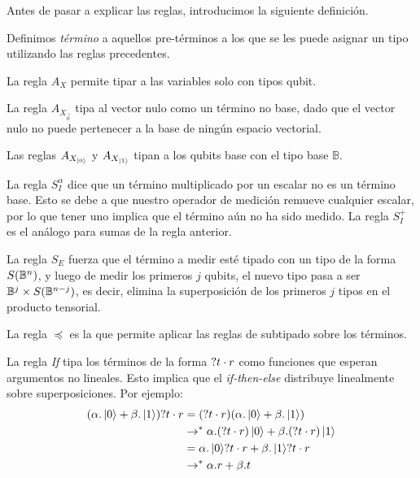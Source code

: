 Antes de pasar a explicar las reglas, introducimos la siguiente definición.

\begin{definition}
	Definimos \textit{término} a aquellos pre-términos a los que se les puede asignar un tipo utilizando las reglas precedentes.
\end{definition}

La regla \( A_X \) permite tipar a las variables solo con tipos qubit.

La regla \( A_{X_{\vec{0}}} \) tipa al vector nulo como un término no base, dado que el vector nulo no puede pertenecer a la base de ningún espacio vectorial.

Las reglas \( A_{X_{\ket{0}}} \) y \( A_{X_{\ket{1}}} \) tipan a los qubits base con el tipo base \( \mathbb{B} \).

La regla \( S_I^\alpha \) dice que un término multiplicado por un escalar no es un término base. Esto se debe a que nuestro operador de medición remueve cualquier escalar, por lo que tener uno implica que el término aún no ha sido medido. La regla \( S_I^+ \) es el análogo para sumas de la regla anterior.

La regla \( S_E \) fuerza que el término a medir esté tipado con un tipo de la forma \( S(\mathbb{B}^n) \), y luego de medir los primeros \( j \) qubits, el nuevo tipo pasa a ser \( \mathbb{B}^j \times S(\mathbb{B}^{n - j}) \), es decir, elimina la superposición de los primeros \( j \) tipos en el producto tensorial.

La regla \( \preceq \) es la que permite aplicar las reglas de subtipado sobre los términos.

La regla \textit{If} tipa los términos de la forma \( ? t \cdot r \) como funciones que esperan argumentos no lineales. Esto implica que el \textit{if-then-else} distribuye linealmente sobre superposiciones. Por ejemplo:
\begin{equation*}
	\begin{split}
		(\alpha . \ket{0} + \beta . \ket{1})? t \cdot r
		& = (? t \cdot r) (\alpha . \ket{0} + \beta . \ket{1}) \\
		& \rightarrow^* \alpha . (? t \cdot r) \ket{0} + \beta . (? t \cdot r) \ket{1} \\
		& = \alpha . \ket{0}? t \cdot r + \beta . \ket{1}? t \cdot r \\
		& \rightarrow^* \alpha . r + \beta . t
	\end{split}
\end{equation*}

